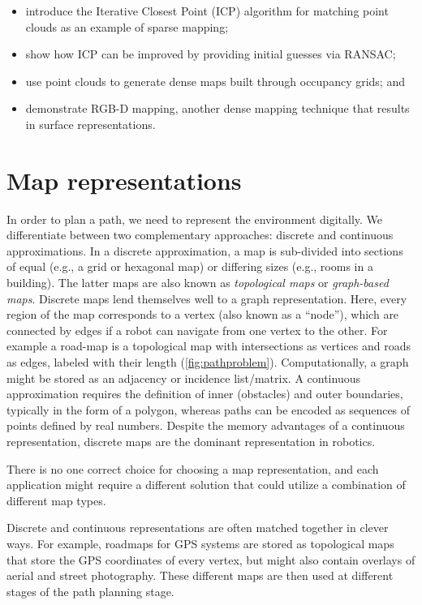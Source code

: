 \begin{itemize}
    \item introduce the Iterative Closest Point (ICP) algorithm for matching point clouds as an example of sparse mapping;
    \item show how ICP can be improved by providing initial guesses via RANSAC;
    \item use point clouds to generate dense maps built through occupancy grids; and
    \item demonstrate RGB-D mapping, another dense mapping technique that results in surface representations.
\end{itemize}

\section{Map representations}\label{sec:maps}
In order to plan a path, we need to represent the environment digitally. We
differentiate between two complementary approaches: discrete and continuous
approximations. In a discrete approximation, a map is sub-divided into sections
of equal (e.g., a grid or hexagonal map) or differing sizes (e.g., rooms in a
building). The latter maps are also known as \textsl{topological maps} or
\textsl{graph-based maps}.
Discrete maps lend themselves well to a graph representation. Here, every
region of the map corresponds to a vertex (also known as a ``node''), which are
connected by edges if a robot can navigate from one vertex to the other. For
example a road-map is a topological map with intersections as vertices and
roads as edges, labeled with their length (\cref{fig:pathproblem}).
Computationally, a graph might be stored as an adjacency or incidence
list/matrix. A continuous approximation requires the definition of inner
(obstacles) and outer boundaries, typically in the form of a polygon, whereas
paths can be encoded as sequences of points defined by real numbers. Despite
the memory advantages of a continuous representation, discrete maps are the
dominant representation in robotics.

There is no one correct choice for choosing a map representation, and each
application might require a different solution that could utilize a combination
of different map types.

Discrete and continuous representations are often matched together in clever ways. For example, roadmaps for GPS systems are stored as topological maps that store the GPS coordinates of every vertex, but might also contain overlays of aerial and street photography. These different maps are then used at different stages of the path planning stage.


